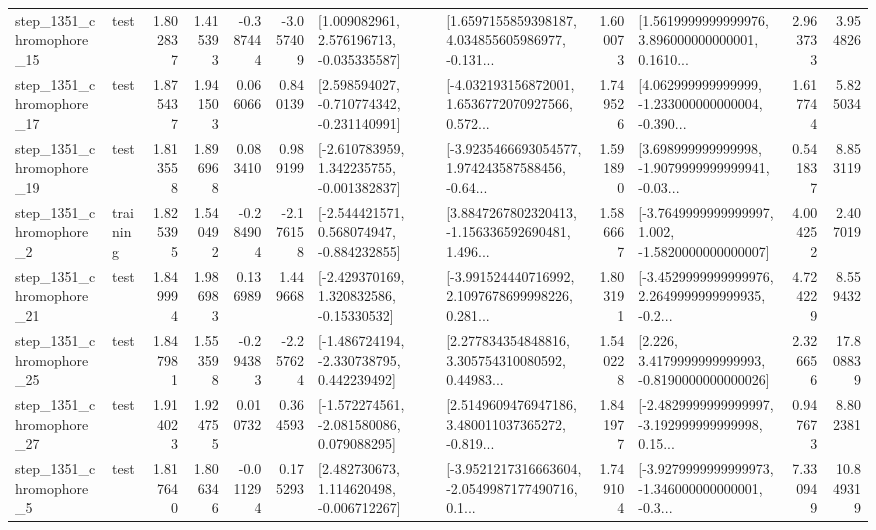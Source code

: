 \begin{tabular}{llrrrrllrlrr}
 step\_1351\_chromophore\_15 &      test &      1.802837 &    1.415393 &     -0.387444 & -3.057409 &    [1.009082961, 2.576196713, -0.035335587] &  [1.6597155859398187, 4.034855605986977, -0.131... &       1.600073 &  [1.5619999999999976, 3.896000000000001, 0.1610... &            2.963733 &          3.954826 \\
 step\_1351\_chromophore\_17 &      test &      1.875437 &    1.941503 &      0.066066 &  0.840139 &   [2.598594027, -0.710774342, -0.231140991] &  [-4.032193156872001, 1.6536772070927566, 0.572... &       1.749526 &  [4.062999999999999, -1.233000000000004, -0.390... &            1.617744 &          5.825034 \\
 step\_1351\_chromophore\_19 &      test &      1.813558 &    1.896968 &      0.083410 &  0.989199 &   [-2.610783959, 1.342235755, -0.001382837] &  [-3.9235466693054577, 1.974243587588456, -0.64... &       1.591890 &  [3.698999999999998, -1.9079999999999941, -0.03... &            0.541837 &          8.853119 \\
  step\_1351\_chromophore\_2 &  training &      1.825395 &    1.540492 &     -0.284904 & -2.176158 &   [-2.544421571, 0.568074947, -0.884232855] &  [3.8847267802320413, -1.156336592690481, 1.496... &       1.586667 &  [-3.7649999999999997, 1.002, -1.5820000000000007] &            4.004252 &          2.407019 \\
 step\_1351\_chromophore\_21 &      test &      1.849994 &    1.986983 &      0.136989 &  1.449668 &    [-2.429370169, 1.320832586, -0.15330532] &  [-3.991524440716992, 2.1097678699998226, 0.281... &       1.803191 &  [-3.4529999999999976, 2.2649999999999935, -0.2... &            4.724229 &          8.559432 \\
 step\_1351\_chromophore\_25 &      test &      1.847981 &    1.553598 &     -0.294383 & -2.257624 &   [-1.486724194, -2.330738795, 0.442239492] &  [2.277834354848816, 3.305754310080592, 0.44983... &       1.540228 &   [2.226, 3.4179999999999993, -0.8190000000000026] &            2.326656 &         17.808839 \\
 step\_1351\_chromophore\_27 &      test &      1.914023 &    1.924755 &      0.010732 &  0.364593 &   [-1.572274561, -2.081580086, 0.079088295] &  [2.5149609476947186, 3.480011037365272, -0.819... &       1.841977 &  [-2.4829999999999997, -3.192999999999998, 0.15... &            0.947673 &          8.802381 \\
  step\_1351\_chromophore\_5 &      test &      1.817640 &    1.806346 &     -0.011294 &  0.175293 &    [2.482730673, 1.114620498, -0.006712267] &  [-3.9521217316663604, -2.0549987177490716, 0.1... &       1.749104 &  [-3.9279999999999973, -1.346000000000001, -0.3... &            7.330949 &         10.849319 \\

\end{tabular}
